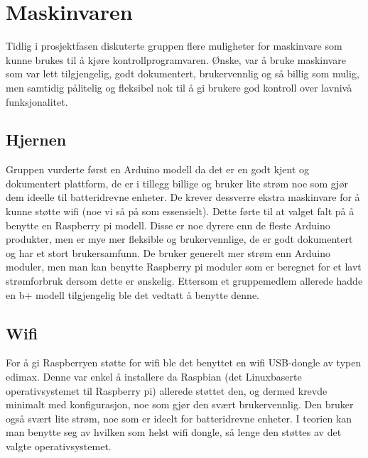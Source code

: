 \documentclass[12pt]{report}
\begin{document}
\section{Maskinvaren}
Tidlig i prosjektfasen diskuterte gruppen flere muligheter for maskinvare som kunne brukes til å kjøre kontrollprogramvaren. Ønske, var å bruke maskinvare som var lett tilgjengelig, godt dokumentert, brukervennlig og så billig som mulig, men samtidig pålitelig og fleksibel nok til å gi brukere god kontroll over lavnivå funksjonalitet. 

\subsection{Hjernen}
Gruppen vurderte først en Arduino modell da det er en godt kjent og dokumentert plattform, de er i tillegg billige og bruker lite strøm noe som gjør dem ideelle til batteridrevne enheter. De krever dessverre ekstra maskinvare for å kunne støtte wifi (noe vi så på som essensielt). Dette førte til at valget falt på å benytte en Raspberry pi modell. Disse er noe dyrere enn de fleste Arduino produkter, men er mye mer fleksible og brukervennlige, de er godt dokumentert og har et stort brukersamfunn. De bruker generelt mer strøm enn Arduino moduler, men man kan benytte Raspberry pi moduler som er beregnet for et lavt strømforbruk\cite{RaspberryApluss} dersom dette er ønskelig. Ettersom et gruppemedlem allerede hadde en b+ modell tilgjengelig ble det vedtatt å benytte denne.

\subsection{Wifi}
For å gi Raspberryen støtte for wifi ble det benyttet en wifi USB-dongle av typen edimax\cite{dongle}. Denne var enkel å installere da Raspbian (det Linuxbaserte operativsystemet til Raspberry pi) allerede støttet den, og dermed krevde minimalt med konfigurasjon, noe som gjør den svært brukervennlig. Den bruker også svært lite strøm, noe som er ideelt for batteridrevne enheter. I teorien kan man benytte seg av hvilken som helst wifi dongle, så lenge den støttes av det valgte operativsystemet.
\end{document}
